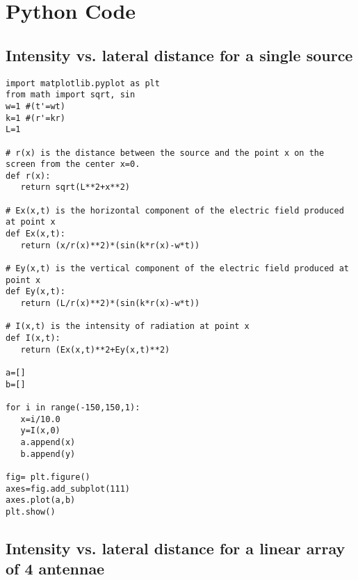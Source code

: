 \chapter{Python Code}

\section{Intensity vs. lateral distance for a single source}\label{code:single}

\begin{Verbatim}[fontsize=\small,baselinestretch=0.9]
import matplotlib.pyplot as plt
from math import sqrt, sin
w=1 #(t'=wt)
k=1 #(r'=kr)
L=1

# r(x) is the distance between the source and the point x on the screen from the center x=0.
def r(x):
   return sqrt(L**2+x**2)

# Ex(x,t) is the horizontal component of the electric field produced at point x 
def Ex(x,t):
   return (x/r(x)**2)*(sin(k*r(x)-w*t))

# Ey(x,t) is the vertical component of the electric field produced at point x 
def Ey(x,t):
   return (L/r(x)**2)*(sin(k*r(x)-w*t))

# I(x,t) is the intensity of radiation at point x
def I(x,t):
   return (Ex(x,t)**2+Ey(x,t)**2)

a=[]
b=[]

for i in range(-150,150,1):
   x=i/10.0
   y=I(x,0)
   a.append(x)
   b.append(y)

fig= plt.figure()
axes=fig.add_subplot(111)
axes.plot(a,b)
plt.show()
\end{Verbatim}


\section{Intensity vs. lateral distance for a linear array of 4 antennae}\label{code:four}

